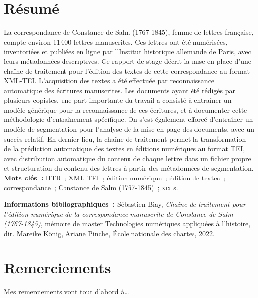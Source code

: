 \documentclass[a4paper,12pt,twoside]{book}
\newcommand{\siecle}[1]{\textsc{#1}\ieme}
\begin{document}
	\chapter*{Résumé}
		\medskip
		La correspondance de Constance de Salm (1767-1845), femme de lettres française, compte environ 11\,000 lettres manuscrites. Ces lettres ont été numérisées, inventoriées et publiées en ligne par l'Institut historique allemande de Paris, avec leurs métadonnées descriptives. Ce rapport de stage décrit la mise en place d'une chaîne de traitement pour l'édition des textes de cette correspondance au format XML-TEI. L'acquisition des textes a été effectuée par reconnaissance automatique des écritures manuscrites. Les documents ayant été rédigés par plusieurs copistes, une part importante du travail a consisté à entraîner un modèle générique pour la reconnaissance de ces écritures, et à documenter cette méthodologie d'entraînement spécifique. On s'est également efforcé d'entraîner un modèle de segmentation pour l'analyse de la mise en page des documents, avec un succès relatif. En dernier lieu, la chaîne de traitement permet la transformation de la prédiction automatique des textes en éditions numériques au format TEI, avec distribution automatique du contenu de chaque lettre dans un fichier propre et structuration du contenu des lettres à partir des métadonnées de segmentation.\\
		
		\textbf{Mots-clés~:} HTR~; XML-TEI~; édition numérique~; édition de textes~; correspondance~; Constance de Salm (1767-1845)~; \siecle{xix} s.
		
		\textbf{Informations bibliographiques~:} Sébastien Biay, \textit{Chaîne de traitement pour l'édition numérique de la correspondance manuscrite de Constance de Salm (1767-1845)}, mémoire de master \og{}Technologies numériques appliquées à l'histoire\fg{}, dir. Mareike König, Ariane Pinche, École nationale des chartes, 2022.
		
	\pagestyle{empty}	
	\cleardoublepage

	\pagestyle{plain}
	\chapter*{Remerciements}
	
		Mes remerciements vont tout d'abord à\dots
		
	\pagestyle{empty}	
	\cleardoublepage
	
	\pagestyle{plain}
	\tableofcontents
	
	\pagestyle{empty}	
	\cleardoublepage
		
\end{document}
